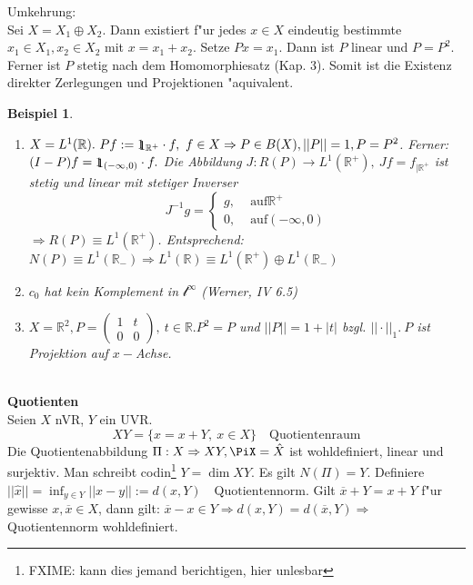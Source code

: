 \documentclass[a4paper,11pt]{book}
\newcommand{\R}{{\mathbb R}}
\newcommand{\sll}{{\mathcal l}}
\newcommand{\id}{1\hspace{-0,9ex}\raisebox{-0,2ex}{1}}
\newtheorem{Bsp}[Def]{Beispiel}
\theoremstyle{nonumberplain}
\begin{document}
Umkehrung:\\
Sei $X = X_1 \oplus X_2$. Dann existiert f"ur jedes $x \in X$ eindeutig bestimmte $x_1 \in X_1, x_2 \in X_2$ mit $x = x_1 + x_2$. Setze $Px = x_1$. Dann ist $P$ linear und $P=P^2$. Ferner ist $P$ stetig nach dem Homomorphiesatz (Kap. 3). Somit ist die Existenz direkter Zerlegungen und Projektionen "aquivalent.

\begin{Bsp}
\begin{enumerate}

\item[a)] $X = L^1(\R).\ Pf := \id_{\R^+} \cdot f,\ f \in X \Rightarrow P \in B(X), ||P|| = 1, P = P^2$. Ferner: $(I-P)f = \id_{(-\infty,0)} \cdot f.$ Die Abbildung $J: R(P) \rightarrow L^1(\R^+),\ Jf = f_{|\R^+}$ ist stetig und linear mit stetiger Inverser
\[
J^{-1}g = \left\{
\begin{array}{rl}
g ,& \text{ auf} \R^+ \\
0 ,& \text{ auf} (-\infty,0)
\end{array} \right.
\]
$\Rightarrow R(P) \equiv L^1(\R^+)$. Entsprechend: $N(P) \equiv L^1(\R_-) \Rightarrow L^1(\R) \equiv L^1(\R^+) \oplus L^1(\R_-)$

\item[b)] $c_0$ hat kein Komplement in $\sll^{\infty}$ (Werner, IV 6.5)

\item[c)] $X = \R^2, P = \begin{pmatrix} 1 & t \\ 0 & 0 \end{pmatrix},\ t \in \R. P^2 = P$ und $||P|| = 1 + |t|$ bzgl. $||\cdot||_1.\ P$ ist Projektion auf $x-$Achse.
\end{enumerate}
\end{Bsp}
\\
\textbf{Quotienten}\\
Seien $X$ nVR, $Y$ ein UVR.
\[
X Y = \{ \hat{x} = x + Y,\ x \in X \} \quad \text{Quotientenraum}
\]
Die Quotientenabbildung $\Pi: X \Rightarrow X Y, \PiX = \hat{X}$ ist wohldefiniert, linear und surjektiv. Man schreibt codin\footnote{FXIME: kann dies jemand berichtigen, hier unlesbar} $Y = \dim X Y.$ Es gilt $N(\Pi) = Y$. Definiere $||\hat{x}|| = \inf_{y \in Y} ||x-y|| := d(x,Y) \quad \text{Quotientennorm}$. Gilt $\overline{x}+Y = x + Y$ f"ur gewisse $x,\overline{x} \in X$, dann gilt: $\overline{x}-x \in Y \Rightarrow d(x,Y) = d(\overline{x},Y) \Rightarrow$ Quotientennorm wohldefiniert.\\
\end{document}
